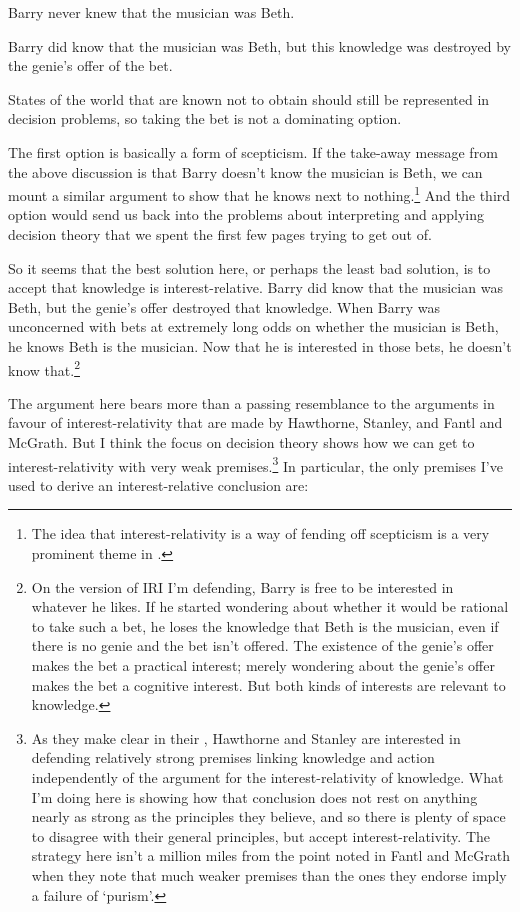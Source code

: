 \begin{enumerate*}
\item Barry never knew that the musician was Beth.
\item Barry did know that the musician was Beth, but this knowledge was destroyed by the genie's offer of the bet.
\item States of the world that are known not to obtain should still be represented in decision problems, so taking the bet is not a dominating option.
\end{enumerate*}

\noindent The first option is basically a form of scepticism. If the take-away message from the above discussion is that Barry doesn't know the musician is Beth, we can mount a similar argument to show that he knows next to nothing.\footnote{The idea that interest-relativity is a way of fending off scepticism is a very prominent theme in \cite{FantlMcGrath2009}.} And the third option would send us back into the problems about interpreting and applying decision theory that we spent the first few pages trying to get out of.

So it seems that the best solution here, or perhaps the least bad solution, is to accept that knowledge is interest-relative. Barry did know that the musician was Beth, but the genie's offer destroyed that knowledge. When Barry was unconcerned with bets at extremely long odds on whether the musician is Beth, he knows Beth is the musician. Now that he is interested in those bets, he doesn't know that.\footnote{On the version of IRI I'm defending, Barry is free to be interested in whatever he likes. If he started wondering about whether it would be rational to take such a bet, he loses the knowledge that Beth is the musician, even if there is no genie and the bet isn't offered. The existence of the genie's offer makes the bet a practical interest; merely wondering about the genie's offer makes the bet a cognitive interest. But both kinds of interests are relevant to knowledge.}

The argument here bears more than a passing resemblance to the arguments in favour of interest-relativity that are made by Hawthorne, Stanley, and Fantl and McGrath. But I think the focus on decision theory shows how we can get to interest-relativity with very weak premises.\footnote{As they make clear in their \citeyearpar{Hawthorne2008-HAWKAA}, Hawthorne and Stanley are interested in defending relatively strong premises linking knowledge and action independently of the argument for the interest-relativity of knowledge. What I'm doing here is showing how that conclusion does not rest on anything nearly as strong as the principles they believe, and so there is plenty of space to disagree with their general principles, but accept interest-relativity. The strategy here isn't a million miles from the point noted in Fantl and McGrath \citeyearpar[72n14]{FantlMcGrath2009} when they note that much weaker premises than the ones they endorse imply a failure of `purism'.} In particular, the only premises I've used to derive an interest-relative conclusion are:

